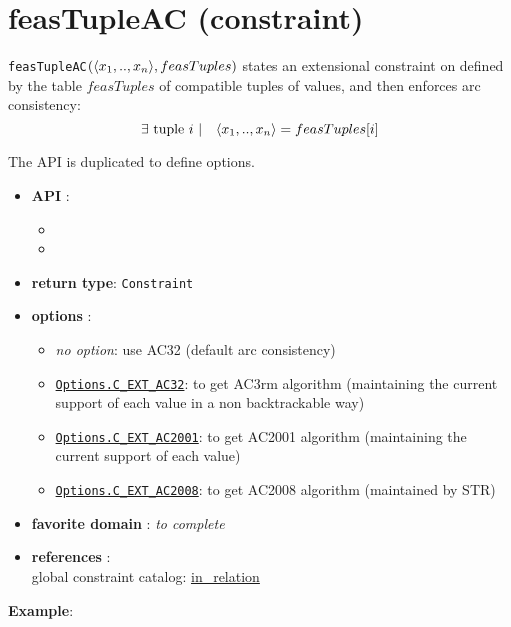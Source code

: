 \label{feastupleac}
\hypertarget{feastupleac}{}

\section{feasTupleAC (constraint)}\label{feastupleac:feastupleacconstraint}\hypertarget{feastupleac:feastupleacconstraint}{}
\begin{notedef}
  \texttt{feasTupleAC}$(\langle x_1,..,x_n\rangle,feasTuples)$ states an extensional constraint on  defined by the table $feasTuples$ of compatible tuples of values, and then enforces arc consistency:
      $$\exists \text{ tuple } i\ |\quad \langle x_1,..,x_n\rangle=feasTuples[i]$$
\end{notedef}

The API is duplicated to define options.
\begin{itemize}
	\item \textbf{API} :
	\begin{itemize}
		\item {}
		\item {}
	\end{itemize}
	\item \textbf{return type}: \texttt{Constraint}
	\item \textbf{options} :
	\begin{itemize}
		\item \emph{no option}: use AC32 (default arc consistency)
		\item \hyperlink{cext32:cext32options}{\tt Options.C\_EXT\_AC32}: to get AC3rm algorithm (maintaining the current support of each value in a non backtrackable way)
		\item \hyperlink{cext2001:cext2001options}{\tt Options.C\_EXT\_AC2001}: to get AC2001 algorithm (maintaining the current support of each value)
		\item \hyperlink{cext2008:cext2008options}{\tt Options.C\_EXT\_AC2008}: to get AC2008 algorithm (maintained by STR)
	\end{itemize}
	\item \textbf{favorite domain} : \emph{to complete}
	\item \textbf{references} :\\
      global constraint catalog: \href{http://www.emn.fr/x-info/sdemasse/gccat/Cin_relation.html}{in\_relation}
\end{itemize}

\textbf{Example}:

